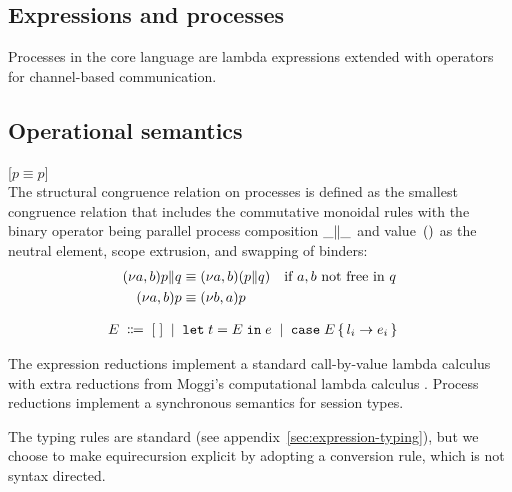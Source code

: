 \subsection{Expressions and processes}
\label{sec:expr-proc}

Processes in the core language are lambda expressions extended with
operators for channel-based communication.



\subsection{Operational semantics}

[$p \equiv p$]\medskip\\
The structural congruence relation on processes is defined as the smallest
congruence relation that includes the commutative monoidal rules with the
binary operator being parallel process composition $\PPar \_ \_$ and
value~$\EUnit$ as the neutral element, scope extrusion, and swapping
of binders:
\begin{align*}
  \PPar{\PScope p}{q} &\equiv \PScope (\PPar p q)
  \quad\text{if $a,b$ not free in $q$}
  \\
  \PScope p &\equiv \PScope[b,a] p
\end{align*}

\begin{align*}
  E \grmdef&
    \EHole \grmor
    \ELet t E e \grmor
    \ECase E { l_i \rightarrow e_i }
\end{align*}



The expression reductions implement a standard call-by-value lambda
calculus with extra reductions from Moggi's computational lambda
calculus \cite{DBLP:conf/lics/Moggi89}. Process reductions implement a synchronous semantics for
session types.

The typing rules are standard (see appendix~\ref{sec:expression-typing}), but we choose to make
equirecursion explicit by adopting a conversion rule, which is not
syntax directed.
\begin{mathpar}
\end{mathpar}

